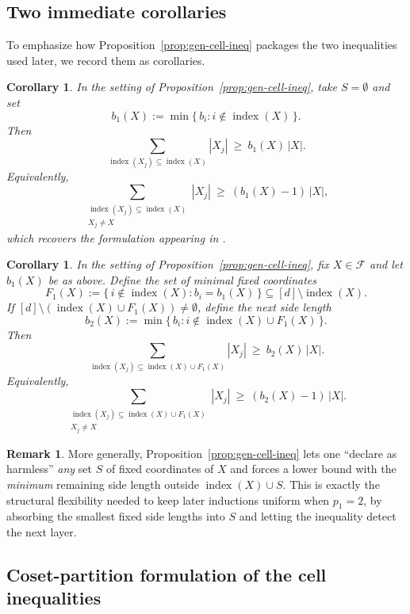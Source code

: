 \documentclass[11pt,reqno]{amsart}
\newtheorem{corollary}[theorem]{Corollary}
\theoremstyle{definition}
\newtheorem{remark}[theorem]{Remark}
\DeclareMathOperator{\ind}{index}
\begin{document}
\subsection{Two immediate corollaries}

To emphasize how Proposition~\ref{prop:gen-cell-ineq} packages the two inequalities used later, we record them as corollaries.

\begin{corollary}\label{cor:bff-prop1-including}
In the setting of Proposition~\ref{prop:gen-cell-ineq}, take \(S=\emptyset\) and set
\[
  b_1(X):=\min\{\,b_i : i\notin \ind(X)\,\}.
\]
Then
\[
  \sum_{\ind(X_j)\subseteq \ind(X)} |X_j|\ \ge\ b_1(X)\,|X|.
\]
Equivalently,
\[
  \sum_{\substack{\ind(X_j)\subseteq \ind(X)\\ X_j\neq X}} |X_j|\ \ge\ (b_1(X)-1)\,|X|,
\]
which recovers the formulation appearing in \cite[\S2]{BFF}.
\end{corollary}

\begin{corollary}\label{cor:two-level-variant}
In the setting of Proposition~\ref{prop:gen-cell-ineq}, fix \(X\in\mathcal{F}\) and let \(b_1(X)\) be as above.
Define the set of \emph{minimal fixed coordinates}
\[
  F_1(X):=\{\, i\notin \ind(X) : b_i=b_1(X)\,\}\subseteq [d]\setminus \ind(X).
\]
If \([d]\setminus (\ind(X)\cup F_1(X))\neq\emptyset\), define the \emph{next} side length
\[
  b_2(X):=\min\{\,b_i : i\notin \ind(X)\cup F_1(X)\,\}.
\]
Then
\[
  \sum_{\ind(X_j)\subseteq \ind(X)\cup F_1(X)} |X_j|\ \ge\ b_2(X)\,|X|.
\]
Equivalently,
\[
  \sum_{\substack{\ind(X_j)\subseteq \ind(X)\cup F_1(X)\\ X_j\neq X}} |X_j|
  \ \ge\ (b_2(X)-1)\,|X|.
\]
\end{corollary}

\begin{remark}
More generally, Proposition~\ref{prop:gen-cell-ineq} lets one ``declare as harmless'' \emph{any} set \(S\) of fixed coordinates of \(X\)
and forces a lower bound with the \emph{minimum} remaining side length outside \(\ind(X) \cup S\).
This is exactly the structural flexibility needed to keep later inductions uniform when \(p_1=2\),
by absorbing the smallest fixed side lengths into \(S\) and letting the inequality detect the next layer.
\end{remark}

\subsection{Coset-partition formulation of the cell inequalities}
\end{document}
